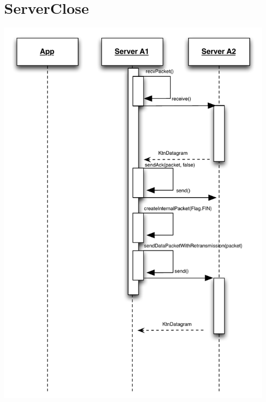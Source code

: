 \documentclass{article}
\begin{document}
\section{ServerClose}
\includegraphics[scale=0.8]{ktnServerClose.pdf}
\end{document}
